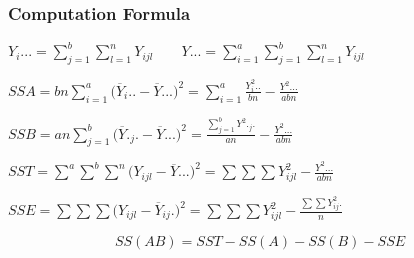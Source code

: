 \documentclass[11pt,a4paper]{article}
\theoremstyle{definition}
\begin{document}
\subsubsection*{Computation Formula}

$\displaystyle{Y_{i}...=\sum^b_{j=1}\sum^n_{l=1}Y_{ijl}\qquad  Y...=\sum^a_{i=1}\sum^b_{j=1}\sum^n_{l=1}Y_{ijl}}$


$SSA = \displaystyle{bn\sum^a_{i=1}\big(\overline{Y}_i..-\overline{Y}...\big)^2=\sum^a_{i=1}\frac{Y^2_{i}..}{bn}-\frac{Y^2...}{abn}}$


$SSB = \displaystyle{an\sum^b_{j=1}\big(\overline{Y}._j.-\overline{Y}...\big)^2=\frac{\sum^b_{j=1}Y^2._j.}{an}-\frac{Y^2...}{abn}}$


$SST = \displaystyle{\sum^a\sum^b\sum^n\big(Y_{ijl}-\overline{Y}...\big)^2=\sum\sum\sum Y^2_{ijl}-\frac{Y^2...}{abn}}$


$SSE=\displaystyle{\sum \sum\sum \big(Y_{ijl}-\overline{Y}_{ij}.\big)^2=\sum\sum\sum Y^2_{ijl}-\frac{\sum \sum Y^2_{ij}.}{n}}$


$$SS(AB)=SST-SS(A)-SS(B)-SSE$$\\
\end{document}
